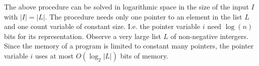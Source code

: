 The above procedure can be solved in logarithmic space in the size of the
input $I$ with $|I|=|L|$.\newline
\noindent The procedure needs only one pointer to an element in the list $L$
and one count variable of constant size. I.e. the pointer variable $i$ need $%
\log (n) $ bits for its representation. Observe a very large list $L$ of
non-negative intergers. Since the memory of a program is limited to constant
many pointers, the pointer variable $i$ uses at most $O(\log _{2}|L|)$ bits
of memory.

\bigskip


%

